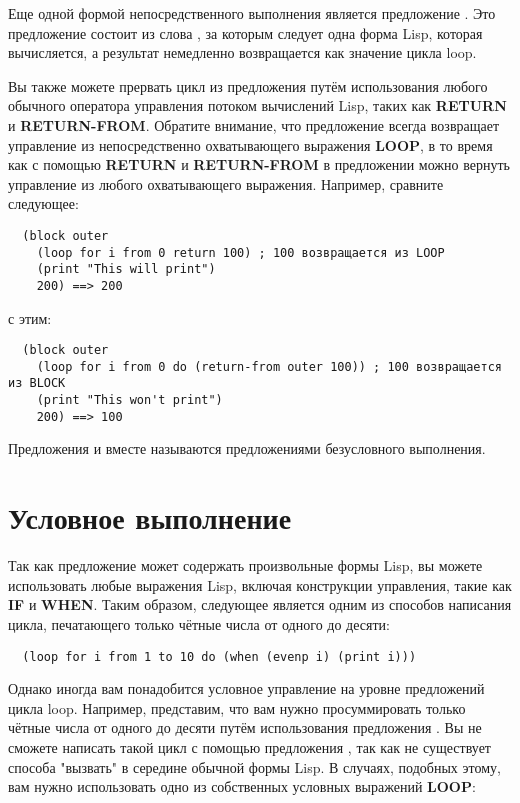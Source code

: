 Еще одной формой непосредственного выполнения является предложение . Это
предложение состоит из слова , за которым следует одна форма Lisp, которая
вычисляется, а результат немедленно возвращается как значение цикла loop.

Вы также можете прервать цикл из предложения  путём использования любого обычного
оператора управления потоком вычислений Lisp, таких как \textbf{RETURN} и
\textbf{RETURN-FROM}. Обратите внимание, что предложение  всегда возвращает
управление из непосредственно охватывающего выражения \textbf{LOOP}, в то время как с
помощью \textbf{RETURN} и \textbf{RETURN-FROM} в предложении  можно вернуть
управление из любого охватывающего выражения. Например, сравните следующее:

\begin{lstlisting}
  (block outer
    (loop for i from 0 return 100) ; 100 возвращается из LOOP
    (print "This will print")
    200) ==> 200
\end{lstlisting}

с этим:

\begin{lstlisting}
  (block outer
    (loop for i from 0 do (return-from outer 100)) ; 100 возвращается из BLOCK
    (print "This won't print")
    200) ==> 100
\end{lstlisting}

Предложения  и  вместе называются предложениями безусловного
выполнения.

\section{Условное выполнение}

Так как предложение  может содержать произвольные формы Lisp, вы можете
использовать любые выражения Lisp, включая конструкции управления, такие как \textbf{IF} и
\textbf{WHEN}. Таким образом, следующее является одним из способов написания цикла,
печатающего только чётные числа от одного до десяти:

\begin{lstlisting}
  (loop for i from 1 to 10 do (when (evenp i) (print i)))
\end{lstlisting}

Однако иногда вам понадобится условное управление на уровне предложений цикла
loop. Например, представим, что вам нужно просуммировать только чётные числа от одного до
десяти путём использования предложения . Вы не сможете написать такой цикл с
помощью предложения , так как не существует способа "вызвать"  в
середине обычной формы Lisp. В случаях, подобных этому, вам нужно использовать одно из
собственных условных выражений \textbf{LOOP}:

